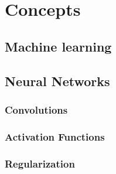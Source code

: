 %
\chapter{Concepts}
\label{sec:concepts}


\section{Machine learning}
\label{sec:concepts:ml}

\section{Neural Networks}
\label{sec:concepts:nn}

\subsection{Convolutions} %
\label{sub:conepts:nn:conv}

\subsection{Activation Functions} %
\label{sub:conepts:nn:activations}

\subsection{Regularization} %
\label{sub:conepts:nn:regularization}

